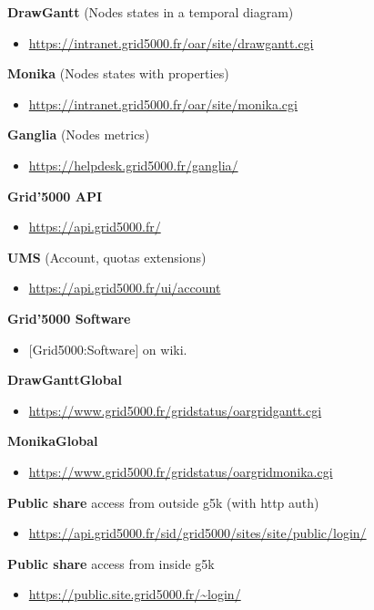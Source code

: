 \textbf{DrawGantt} (Nodes states in a temporal diagram)
\begin{itemize}
\item \url{https://intranet.grid5000.fr/oar/site/drawgantt.cgi}
\end{itemize}

\textbf{Monika} (Nodes states with properties)
\begin{itemize}
\item \url{https://intranet.grid5000.fr/oar/site/monika.cgi}
\end{itemize}

\textbf{Ganglia} (Nodes metrics)
\begin{itemize}
\item \url{https://helpdesk.grid5000.fr/ganglia/}
\end{itemize}

\textbf{Grid'5000 API}
\begin{itemize}
\item \url{https://api.grid5000.fr/}
\end{itemize}

\textbf{UMS} (Account, quotas extensions)
\begin{itemize}
\item \url{https://api.grid5000.fr/ui/account}
\end{itemize}

\textbf{Grid'5000 Software}
\begin{itemize}
\item $[$Grid5000:Software$]$ on wiki.
\end{itemize}

\textbf{DrawGanttGlobal}
\begin{itemize}
\item \url{https://www.grid5000.fr/gridstatus/oargridgantt.cgi}
\end{itemize}

\textbf{MonikaGlobal}
\begin{itemize}
\item \url{https://www.grid5000.fr/gridstatus/oargridmonika.cgi}
\end{itemize}

\textbf{Public share} access from outside g5k (with http auth)
\begin{itemize}
\item \url{https://api.grid5000.fr/sid/grid5000/sites/site/public/login/}
\end{itemize}

\textbf{Public share} access from inside g5k
\begin{itemize}
\item \url{https://public.site.grid5000.fr/~login/}
\end{itemize}

